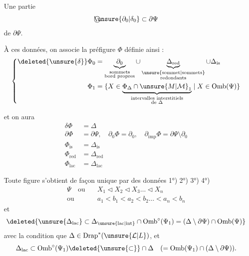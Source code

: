  Une partie
\[
\text{\textcircled{$\unsure{\partial_0|\delta_0}$}}\subset\partial\Psi
\]
de $\partial\Psi$.

À ces données, on associe la préfigure $\Phi$ définie ainsi :
\[
\left\{\begin{aligned}
\deleted{\unsure{\delta}}\Phi_0&=\underbrace{\partial_0}_{\substack{\text{sommets}\\\text{bord propres}}}\cup\underbrace{\Delta_{\mathrm{red}}}_{\substack{\text{\unsure{sommet|sommets}}\\\text{redondants}}}\cup\Delta_{\mathrm{is}}\\
\Phi_1&=\{X\in\underbrace{\Phi_{\Delta}\cap\unsure{M|\mathcal{M}}_1}_{\substack{\text{intervalles interstitiels}\\\text{de }\Delta}}\mid X\in\mathrm{Omb}(\Psi)\}
\end{aligned}\right.
\]


et on aura
\[
\begin{aligned}
\delta\Phi&=\Delta\\
\partial\Phi&=\partial\Psi,\quad\partial_0\Phi=\partial_0,\quad\partial_{\mathrm{imp}}\Phi=\partial\Psi\setminus\partial_0\\
\Phi_{\mathrm{is}}&=\Delta_{\mathrm{is}}\\
\Phi_{\mathrm{red}}&=\Delta_{\mathrm{red}}\\
\Phi_{\mathrm{lac}}&=\Delta_{\mathrm{lac}}
\end{aligned}
\]

Toute figure s'obtient de façon unique par des données 1°) 2°) 3°) 4°)
\[
\begin{aligned}
\Psi\quad\text{ou}\quad&X_1\lhd X_2\lhd X_3\ldots\lhd X_n\\
\text{ou}\quad&a_1<b_1<a_2<b_2\ldots<a_n<b_n
\end{aligned}
\]
et
\[
\deleted{\unsure{\Delta_{\mathrm{lac}}}\subset\Delta_{\unsure{\mathrm{lac}|\mathrm{int}}}\cap\mathrm{Omb}^{\circ}(\Psi_1)=(\Delta\setminus\partial\Psi)\cap\mathrm{Omb}(\Psi)}
\]
avec la condition que $\Delta\in\mathrm{Drap}^{*}(\unsure{\mathcal{L}|L})$, et
\[
\Delta_{\mathrm{lac}}\subset\mathrm{Omb}^{\circ}(\Psi_1)\deleted{\unsure{\subset}}\cap\Delta\quad(=\mathrm{Omb}(\Psi_1)\cap(\Delta\setminus\partial\Psi)).
\]

